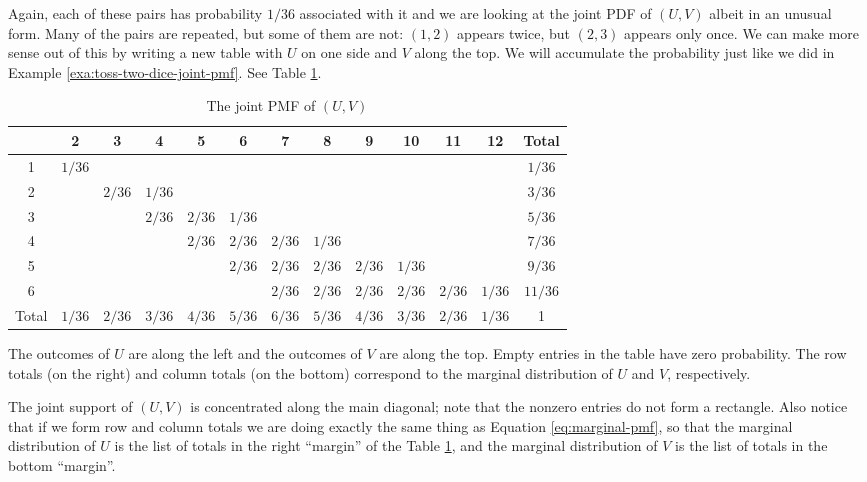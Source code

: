 \documentclass[captions=tableheading]{scrbook}
\begin{document}
\begin{example}
Again, each of these pairs has probability \(1/36\) associated with it and we are looking at the joint PDF of \((U,V)\) albeit in an unusual form. Many of the pairs are repeated, but some of them are not: \((1,2)\) appears twice, but \((2,3)\) appears only once. We can make more sense out of this by writing a new table with \(U\) on one side and \(V\) along the top. We will accumulate the probability just like we did in Example \ref{exa:toss-two-dice-joint-pmf}. See Table \ref{tab:max-sum-joint-pmf}.

\begin{table}
\begin{centering}
\begin{tabular}{|c|ccccccccccc|c|}
\hline 
 & {\small 2} & {\small 3} & {\small 4} & {\small 5} & {\small 6} & {\small 7} & {\small 8} & {\small 9} & {\small 10} & {\small 11} & {\small 12} & {\small Total}\tabularnewline
\hline
{\small 1} & {\small \(1/36\)} &  &  &  &  &  &  &  &  &  &  & {\small \(1/36\)}\tabularnewline
{\small 2} &  & {\small \(2/36\)} & {\small \(1/36\)} &  &  &  &  &  &  &  &  & {\small \(3/36\)}\tabularnewline
{\small 3} &  &  & {\small \(2/36\)} & {\small \(2/36\)} & {\small \(1/36\)} &  &  &  &  &  &  & {\small \(5/36\)}\tabularnewline
{\small 4} &  &  &  & {\small \(2/36\)} & {\small \(2/36\)} & {\small \(2/36\)} & {\small \(1/36\)} &  &  &  &  & {\small \(7/36\)}\tabularnewline
{\small 5} &  &  &  &  & {\small \(2/36\)} & {\small \(2/36\)} & {\small \(2/36\)} & {\small \(2/36\)} & {\small \(1/36\)} &  &  & {\small \(9/36\)}\tabularnewline
{\small 6} &  &  &  &  &  & {\small \(2/36\)} & {\small \(2/36\)} & {\small \(2/36\)} & {\small \(2/36\)} & {\small \(2/36\)} & {\small \(1/36\)} & {\small \(11/36\)}\tabularnewline
\hline 
{\small Total} & {\small \(1/36\)} & {\small \(2/36\)} & {\small \(3/36\)} & {\small \(4/36\)} & {\small \(5/36\)} & {\small \(6/36\)} & {\small \(5/36\)} & {\small \(4/36\)} & {\small \(3/36\)} & {\small \(2/36\)} & {\small \(1/36\)} & {\small 1}\tabularnewline
\hline
\end{tabular}
\par\end{centering}
\caption{The joint PMF of \((U,V)\)\label{tab:max-sum-joint-pmf} }
{\small The outcomes of \(U\) are along the left and the outcomes of \(V\) are along the top. Empty entries in the table have zero probability. The row totals (on the right) and column totals (on the bottom) correspond to the marginal distribution of \(U\) and \(V\), respectively. }
\end{table}

The joint support of \((U,V)\) is concentrated along the main diagonal;  note that the nonzero entries do not form a rectangle. Also notice that if we form row and column totals we are doing exactly the same thing as Equation \ref{eq:marginal-pmf}, so that the marginal distribution of \(U\) is the list of totals in the right ``margin'' of the Table \ref{tab:max-sum-joint-pmf}, and the marginal distribution of \(V\)  is the list of totals in the bottom ``margin''. 
\end{example}
\end{document}
